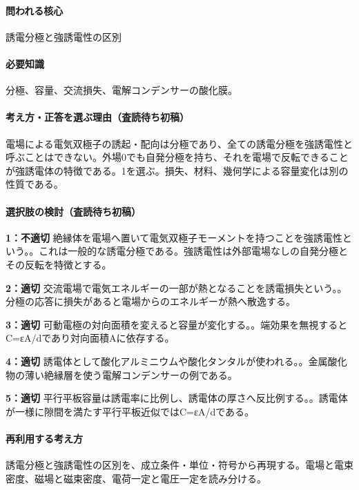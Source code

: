\paragraph{問われる核心} 誘電分極と強誘電性の区別

\paragraph{必要知識} 分極、容量、交流損失、電解コンデンサーの酸化膜。

\paragraph{考え方・正答を選ぶ理由（査読待ち初稿）} 電場による電気双極子の誘起・配向は分極であり、全ての誘電分極を強誘電性と呼ぶことはできない。外場0でも自発分極を持ち、それを電場で反転できることが強誘電体の特徴である。1を選ぶ。損失、材料、幾何学による容量変化は別の性質である。

\paragraph{選択肢の検討（査読待ち初稿）}\mbox{}\par

\noindent\textbf{1：不適切} 絶縁体を電場へ置いて電気双極子モーメントを持つことを強誘電性という。。これは一般的な誘電分極である。強誘電性は外部電場なしの自発分極とその反転を特徴とする。\par

\noindent\textbf{2：適切} 交流電場で電気エネルギーの一部が熱となることを誘電損失という。。分極の応答に損失があると電場からのエネルギーが熱へ散逸する。\par

\noindent\textbf{3：適切} 可動電極の対向面積を変えると容量が変化する。。端効果を無視するとC=εA/dであり対向面積Aに依存する。\par

\noindent\textbf{4：適切} 誘電体として酸化アルミニウムや酸化タンタルが使われる。。金属酸化物の薄い絶縁層を使う電解コンデンサーの例である。\par

\noindent\textbf{5：適切} 平行平板容量は誘電率に比例し、誘電体の厚さへ反比例する。。誘電体が一様に隙間を満たす平行平板近似ではC=εA/dである。\par

\paragraph{再利用する考え方} 誘電分極と強誘電性の区別を、成立条件・単位・符号から再現する。電場と電束密度、磁場と磁束密度、電荷一定と電圧一定を読み分ける。

